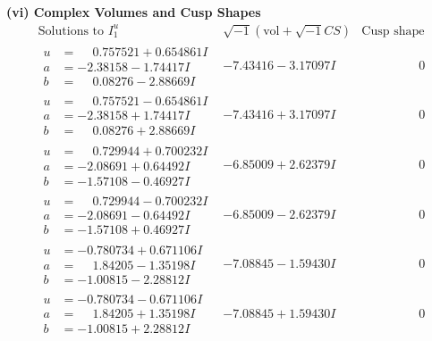 \documentclass[1p]{elsarticle_modified}
\theoremstyle{definition}
\newcommand{\I}{\sqrt{-1}}
\begin{document}
\newpage\flushleft \textbf{(vi) Complex Volumes and Cusp Shapes}
$$\begin{array}{c|c|c}  
\text{Solutions to }I^u_{1}& \I (\text{vol} + \sqrt{-1}CS) & \text{Cusp shape}\\
 \hline 
\begin{aligned}
u &= \phantom{-}0.757521 + 0.654861 I \\
a &= -2.38158 - 1.74417 I \\
b &= \phantom{-}0.08276 - 2.88669 I\end{aligned}
 & -7.43416 - 3.17097 I & \phantom{-0.000000 } 0 \\ \hline\begin{aligned}
u &= \phantom{-}0.757521 - 0.654861 I \\
a &= -2.38158 + 1.74417 I \\
b &= \phantom{-}0.08276 + 2.88669 I\end{aligned}
 & -7.43416 + 3.17097 I & \phantom{-0.000000 } 0 \\ \hline\begin{aligned}
u &= \phantom{-}0.729944 + 0.700232 I \\
a &= -2.08691 + 0.64492 I \\
b &= -1.57108 - 0.46927 I\end{aligned}
 & -6.85009 + 2.62379 I & \phantom{-0.000000 } 0 \\ \hline\begin{aligned}
u &= \phantom{-}0.729944 - 0.700232 I \\
a &= -2.08691 - 0.64492 I \\
b &= -1.57108 + 0.46927 I\end{aligned}
 & -6.85009 - 2.62379 I & \phantom{-0.000000 } 0 \\ \hline\begin{aligned}
u &= -0.780734 + 0.671106 I \\
a &= \phantom{-}1.84205 - 1.35198 I \\
b &= -1.00815 - 2.28812 I\end{aligned}
 & -7.08845 - 1.59430 I & \phantom{-0.000000 } 0 \\ \hline\begin{aligned}
u &= -0.780734 - 0.671106 I \\
a &= \phantom{-}1.84205 + 1.35198 I \\
b &= -1.00815 + 2.28812 I\end{aligned}
 & -7.08845 + 1.59430 I & \phantom{-0.000000 } 0 \\ \hline\begin{aligned}

\end{aligned}
\end{array}$$
\end{document}

